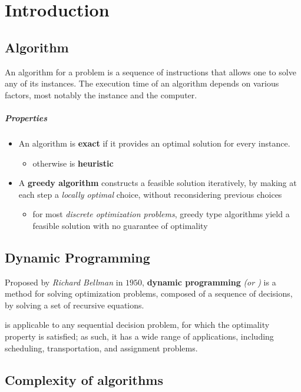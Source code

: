 \documentclass[english]{article}
\begin{document}
\makecover

\section{Introduction}

\subsection{Algorithm}

An algorithm for a problem is a sequence of instructions that allows one to solve any of its instances.
The execution time of an algorithm depends on various factors, most notably the instance and the computer.

\subparagraph*{Properties}

\begin{itemize}
  \item An algorithm is \textbf{exact} if it provides an optimal solution for every instance.
        \begin{itemize}
          \item otherwise is \textbf{heuristic}
        \end{itemize}
  \item A \textbf{greedy algorithm} constructs a feasible solution iteratively, by making at each step a \textit{locally optimal} choice, without reconsidering previous choices
        \begin{itemize}
          \item for most \textit{discrete optimization problems}, greedy type algorithms yield a feasible solution with no guarantee of optimality
        \end{itemize}
\end{itemize}

\subsection{Dynamic Programming}

Proposed by \textit{Richard Bellman} in \(1950\), \textbf{dynamic programming} \textit{(or \DP)} is a method for solving optimization problems, composed of a sequence of decisions, by solving a set of recursive equations.

\DP is applicable to any sequential decision problem, for which the optimality property is satisfied;
as such, it has a wide range of applications, including scheduling, transportation, and assignment problems.

\subsection{Complexity of algorithms}
\end{document}
